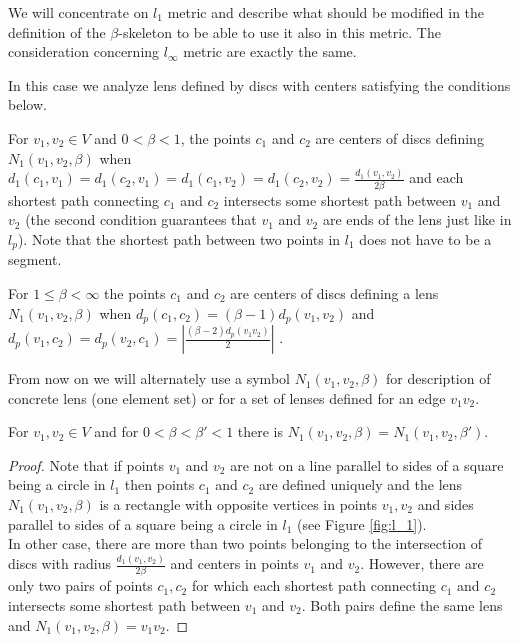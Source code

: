 \documentclass[11pt]{llncs}
\begin{document}
We will concentrate on $l_1$ metric and describe what should be modified in the definition 
of the $\beta$-skeleton to be able to use it also in this metric. The consideration concerning
$l_{\infty}$ metric are exactly the same. 

In this case we analyze lens defined by discs with centers satisfying the conditions below.

For $v_1, v_2 \in V$ and $0<\beta<1$, the points $c_1$ and $c_2$ are centers of discs defining
$N_1(v_1, v_2,\beta)$ when 
$d_1(c_1,v_1)=d_1(c_2,v_1)=d_1(c_1,v_2)=d_1(c_2,v_2)=\frac{d_1(v_1,v_2)}{2 \beta}$ 
and each shortest path connecting $c_1$ and $c_2$ intersects some shortest path between 
$v_1$ and $v_2$ (the second condition guarantees that $v_1$ and $v_2$
are ends of the lens just like in $l_p$). 
Note that the shortest path between two points in $l_1$ does not have to be a segment.

For $1 \leq \beta < \infty$ the points $c_1$ and $c_2$ are centers of discs defining a lens
$N_1(v_1, v_2,\beta)$ when $d_p(c_1, c_2)=(\beta -1)d_p(v_1,v_2)$ and 
$d_p(v_1, c_2)=d_p(v_2,c_1)=|\frac{(\beta -2) d_p(v_1v_2)}{2}|$ .

From now on we will alternately use a symbol $N_1(v_1, v_2,\beta)$ for description
of concrete lens (one element set) or for a set of lenses defined for an edge $v_1v_2$. 



\begin{lemma}
\label{l1-01}
For $v_1,v_2 \in V$ and for $0<\beta<\beta'< 1$ there is $N_1(v_1, v_2,\beta)=N_1(v_1, v_2,\beta')$.
\end{lemma}
\begin{proof}
Note that if points $v_1$ and $v_2$ are not on a line parallel to sides of a square being a circle 
in $l_1$ then points $c_1$ and $c_2$ are defined uniquely and the lens $N_1(v_1, v_2,\beta)$ 
is a rectangle with opposite vertices in points $v_1, v_2$ and sides parallel to sides of a square 
being a circle in $l_1$ (see Figure \ref{fig:l_1}).\\
In other case, there are more than two points belonging to the intersection of discs with radius 
$\frac{d_1(v_1,v_2)}{2 \beta}$ and centers in points $v_1$ and $v_2$. 
However, there are only two pairs of points $c_1, c_2$ for which each shortest path connecting 
$c_1$ and $c_2$ intersects some shortest path between $v_1$ and $v_2$. Both pairs define 
the same lens and $N_1(v_1, v_2,\beta)=v_1v_2$.   
\end{proof}
\end{document}
